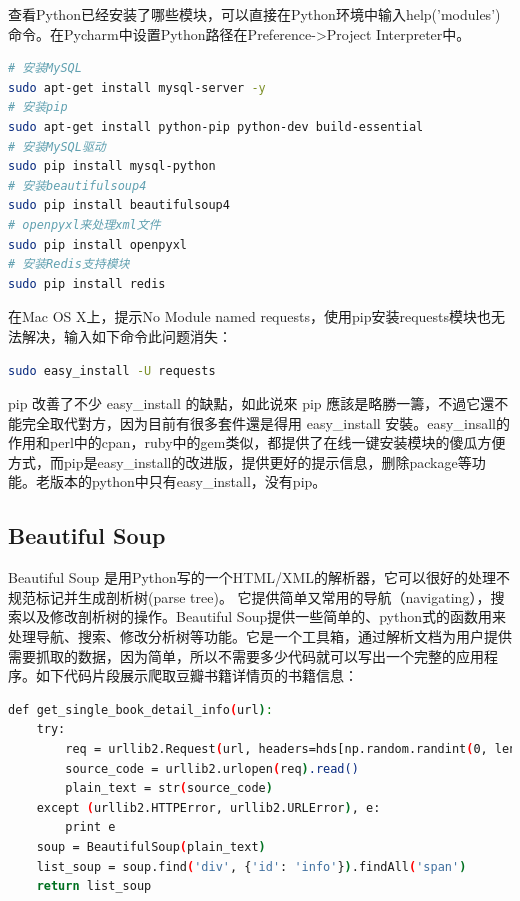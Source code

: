 \documentclass[letter]{book}
\begin{document}
查看Python已经安装了哪些模块，可以直接在Python环境中输入help('modules')命令。在Pycharm中设置Python路径在Preference->Project Interpreter中。

\begin{lstlisting}[language=Bash]
# 安装MySQL
sudo apt-get install mysql-server -y
# 安装pip
sudo apt-get install python-pip python-dev build-essential
# 安装MySQL驱动
sudo pip install mysql-python
# 安装beautifulsoup4
sudo pip install beautifulsoup4
# openpyxl来处理xml文件
sudo pip install openpyxl
# 安装Redis支持模块
sudo pip install redis
\end{lstlisting}

在Mac OS X上，提示No Module named requests，使用pip安装requests模块也无法解决，输入如下命令此问题消失：

\begin{lstlisting}[language=Bash]
sudo easy_install -U requests
\end{lstlisting}

pip 改善了不少 easy\_install 的缺點，如此说來 pip 應該是略勝一籌，不過它還不能完全取代對方，因为目前有很多套件還是得用 easy\_install 安裝。easy\_insall的作用和perl中的cpan，ruby中的gem类似，都提供了在线一键安装模块的傻瓜方便方式，而pip是easy\_install的改进版，提供更好的提示信息，删除package等功能。老版本的python中只有easy\_install，没有pip。

\subsection{Beautiful Soup}

Beautiful Soup 是用Python写的一个HTML/XML的解析器，它可以很好的处理不规范标记并生成剖析树(parse tree)。 它提供简单又常用的导航（navigating），搜索以及修改剖析树的操作。Beautiful Soup提供一些简单的、python式的函数用来处理导航、搜索、修改分析树等功能。它是一个工具箱，通过解析文档为用户提供需要抓取的数据，因为简单，所以不需要多少代码就可以写出一个完整的应用程序。如下代码片段展示爬取豆瓣书籍详情页的书籍信息：

\begin{lstlisting}[language=Bash]
def get_single_book_detail_info(url):
	try:
		req = urllib2.Request(url, headers=hds[np.random.randint(0, len(hds))])
		source_code = urllib2.urlopen(req).read()
		plain_text = str(source_code)
	except (urllib2.HTTPError, urllib2.URLError), e:
		print e
	soup = BeautifulSoup(plain_text)
	list_soup = soup.find('div', {'id': 'info'}).findAll('span')
	return list_soup
\end{lstlisting}
\end{document}
